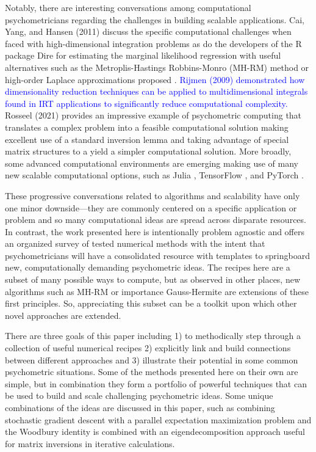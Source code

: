 \documentclass[12pt]{article}
\begin{document}
Notably, there are interesting conversations among computational psychometricians regarding the challenges in building scalable applications. Cai, Yang, and Hansen (2011) discuss the specific computational challenges when faced with high-dimensional integration problems as do the developers of the R package Dire \cite{dire} for estimating the marginal likelihood regression \cite{mislevy} with useful alternatives such as the Metroplis-Hastings Robbins-Monro (MH-RM) method \cite{cai:fisher} or high-order Laplace approximations  proposed \cite{bjorn}. \textcolor{blue}{Rijmen (2009) demonstrated how dimensionality reduction techniques can be applied to multidimensional integrals found in IRT applications to significantly reduce computational complexity.} Rosseel (2021) provides an impressive example of psychometric computing that translates a complex problem into a feasible computational solution making excellent use of a standard inversion lemma and taking advantage of special matrix structures to a yield a simpler computational solution. More broadly, some advanced computational environments are emerging making use of many new scalable computational options, such as Julia \cite{Julia-2017}, TensorFlow \cite{tensorflow2015-whitepaper}, and PyTorch \cite{pytorch}. \nocite{cai} \nocite{psych3020017} \nocite{rijmen:2009}

These progressive conversations related to algorithms and scalability have only one minor downside---they are commonly centered on a specific application or problem and so many computational ideas are spread across disparate resources. In contrast, the work presented here is intentionally problem agnostic and offers an organized survey of tested numerical methods with the intent that psychometricians will have a consolidated resource with templates to springboard new, computationally demanding psychometric ideas. The recipes here are a subset of many possible ways to compute, but as observed in other places, new algorithms such as MH-RM \cite{cai:fisher} or importance Gauss-Hermite \cite{elvira} are extensions of these first principles. So, appreciating this subset can be a toolkit upon which other novel approaches are extended.

There are three goals of this paper including 1) to methodically step through a collection of useful numerical recipes 2) explicitly link and build connections between different approaches and 3) illustrate their potential in some common psychometric situations. Some of the methods presented here on their own are simple, but in combination they form a portfolio of powerful techniques that can be used to build and scale challenging psychometric ideas. Some unique combinations of the ideas are discussed in this paper, such as combining stochastic gradient descent with a parallel expectation maximization problem and the Woodbury identity is combined with an eigendecomposition approach useful for matrix inversions in iterative calculations. 
\end{document}
